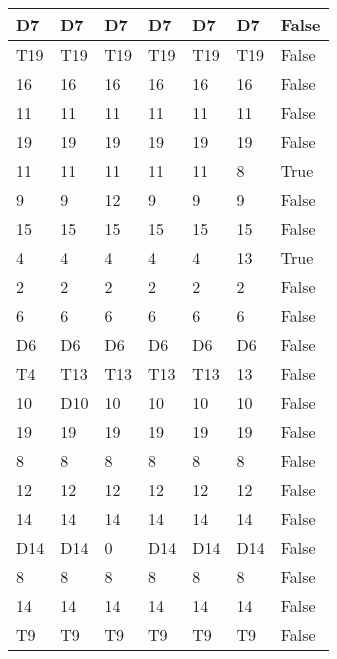 \begin{longtable}[htbp]{| p{} | p{} | p{}| p{}| p{}| p{}| p{}|}
\multicolumn{1}{|l|}{D7} & \multicolumn{1}{l|}{D7} & \multicolumn{1}{l|}{D7} & \multicolumn{1}{l|}{D7} & \multicolumn{1}{l|}{D7} & \multicolumn{1}{l|}{D7} & False \\ \hline
\multicolumn{1}{|l|}{T19} & \multicolumn{1}{l|}{T19} & \multicolumn{1}{l|}{T19} & \multicolumn{1}{l|}{T19} & \multicolumn{1}{l|}{T19} & \multicolumn{1}{l|}{T19} & False \\ \hline
16 & 16 & 16 & 16 & 16 & 16 & False \\ \hline
11 & 11 & 11 & 11 & 11 & 11 & False \\ \hline
19 & 19 & 19 & 19 & 19 & 19 & False \\ \hline
11 & 11 & 11 & 11 & 11 & 8 & True \\ \hline
9 & 9 & 12 & 9 & 9 & 9 & False \\ \hline
15 & 15 & 15 & 15 & 15 & 15 & False \\ \hline
4 & 4 & 4 & 4 & 4 & 13 & True \\ \hline
2 & 2 & 2 & 2 & 2 & 2 & False \\ \hline
6 & 6 & 6 & 6 & 6 & 6 & False \\ \hline
\multicolumn{1}{|l|}{D6} & \multicolumn{1}{l|}{D6} & \multicolumn{1}{l|}{D6} & \multicolumn{1}{l|}{D6} & \multicolumn{1}{l|}{D6} & \multicolumn{1}{l|}{D6} & False \\ \hline
\multicolumn{1}{|l|}{T4} & \multicolumn{1}{l|}{T13} & \multicolumn{1}{l|}{T13} & \multicolumn{1}{l|}{T13} & \multicolumn{1}{l|}{T13} & 13 & False \\ \hline
10 & \multicolumn{1}{l|}{D10} & 10 & 10 & 10 & 10 & False \\ \hline
19 & 19 & 19 & 19 & 19 & 19 & False \\ \hline
8 & 8 & 8 & 8 & 8 & 8 & False \\ \hline
12 & 12 & 12 & 12 & 12 & 12 & False \\ \hline
14 & 14 & 14 & 14 & 14 & 14 & False \\ \hline
\multicolumn{1}{|l|}{D14} & \multicolumn{1}{l|}{D14} & 0 & \multicolumn{1}{l|}{D14} & \multicolumn{1}{l|}{D14} & \multicolumn{1}{l|}{D14} & False \\ \hline
8 & 8 & 8 & 8 & 8 & 8 & False \\ \hline
14 & 14 & 14 & 14 & 14 & 14 & False \\ \hline
\multicolumn{1}{|l|}{T9} & \multicolumn{1}{l|}{T9} & \multicolumn{1}{l|}{T9} & \multicolumn{1}{l|}{T9} & \multicolumn{1}{l|}{T9} & \multicolumn{1}{l|}{T9} & False \\ \hline

\end{longtable}
